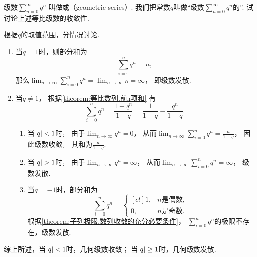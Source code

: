 \begin{example}\label{example:无穷级数.等比级数的收敛性}
级数\(\sum_{n=0}^\infty q^n\)
叫做或（geometric series）.
我们把常数\(q\)叫做“级数\(\sum_{n=0}^\infty q^n\)的”.
试讨论上述等比级数的收敛性.
\begin{solution}
根据\(q\)的取值范围，分情况讨论.
\begin{enumerate}
	\item 当\(q = 1\)时，则部分和为\begin{equation*}
		\sum_{i=0}^n q^n
		= n,
	\end{equation*}
	那么\(\lim_{n\to\infty} \sum_{i=0}^n q^n
	= \lim_{n\to\infty} n
	= \infty\)，
	即级数发散.

	\item 当\(q \neq 1\)，
	根据\cref{theorem:等比数列.前n项和} 有\begin{equation*}
		\sum_{i=0}^n q^n
		= \frac{1-q^n}{1-q}
		= \frac{1}{1-q} - \frac{q^n}{1-q}.
	\end{equation*}
	\begin{enumerate}
		\item 当\(\abs{q} < 1\)时，
		由于\(\lim_{n\to\infty} q^n=0\)，
		从而\(\lim_{n\to\infty} \sum_{i=0}^n q^n
		=\frac{a}{1-q}\)，
		因此级数收敛，
		其和为\(\frac{a}{1-q}\).

		\item 当\(\abs{q} > 1\)时，
		由于\(\lim_{n\to\infty} q^n=\infty\)，
		从而\(\lim_{n\to\infty} \sum_{i=0}^n q^n
		=\infty\)，
		级数发散.

		\item 当\(q = -1\)时，部分和为\begin{equation*}
			\sum_{i=0}^n q^n
			= \begin{cases}[cl]
				1, & \text{\(n\)是偶数}, \\
				0, & \text{\(n\)是奇数}.
			\end{cases}
		\end{equation*}
		根据\cref{theorem:子列极限.数列收敛的充分必要条件}，
		\(\sum_{i=0}^n q^n\)的极限不存在，级数发散.
	\end{enumerate}
\end{enumerate}

综上所述，{\color{red}当\(\abs{q} < 1\)时，几何级数收敛；
当\(\abs{q} \geq 1\)时，几何级数发散.}
\end{solution}
\end{example}

